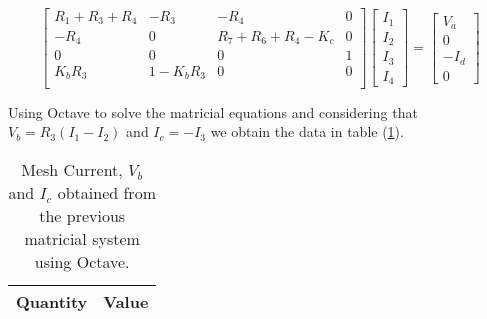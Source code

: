 \begin{equation}
  \begin{bmatrix}
    R_1+R_3+R_4 & -R_3 & -R_4 & 0\\
    -R_4 & 0 & R_7+R_6+R_4-K_c & 0\\
    0 & 0 & 0 & 1\\
    K_b R_3 & 1-K_b R_3 & 0 & 0\\
  \end{bmatrix}
  \begin{bmatrix}
    I_1 \\
    I_2 \\
    I_3 \\
    I_4
  \end{bmatrix}
  =
  \begin{bmatrix}
    V_a \\
    0 \\
    -I_d \\
    0
  \end{bmatrix}
\end{equation}

Using Octave to solve the matricial equations and considering that $V_b = R_3(I_1 - I_2)$ 
and $I_c = - I_3$ we obtain the data in table (\ref{tab:MeshMethod}).

\begin{table}[H]
  \centering
  \begin{tabular}{|l|r|}
    \hline    
    {\bf Quantity} & {\bf Value} \\ \hline
    
  \end{tabular}
  \caption{Mesh Current, $V_b$ and $I_c$ obtained from the previous matricial system using Octave.}
  \label{tab:MeshMethod}
\end{table}